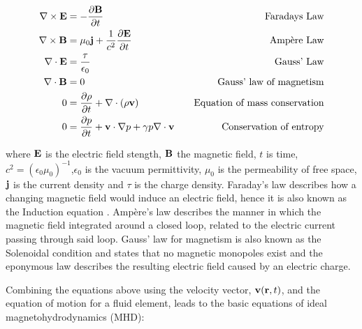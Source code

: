 \begin{align}
	\nabla \times \mathbf{E} &= -\frac{\partial \mathbf{B}}{\partial t }  &\quad \textnormal{Faradays Law}\\
	\nabla \times \mathbf{B} &= \mu_0\mathbf{j} + \frac{1}{c^2}\frac{\partial \mathbf{E}}{\partial t } &\quad \textnormal{Amp{\`e}re Law}\\
	\nabla\cdot\mathbf{E} &= \frac{\tau}{\epsilon_0} &\quad \textnormal{Gauss' Law}\\
	\nabla\cdot\mathbf{B} &= 0 & \quad \textnormal{Gauss' law of magnetism}\\
	0 &= \frac{\partial \rho}{\partial t } + \nabla \cdot (\rho\mathbf{v}) & \quad\textnormal{Equation of mass conservation}\\
	0 &= \frac{\partial p}{\partial t } + \mathbf{v}\cdot\nabla p + \gamma p\nabla\cdot\mathbf{v} & \quad \textnormal{Conservation of entropy}
\end{align}

\noindent where $\mathbf{E}$ is the electric field stength, $\mathbf{B}$ the magnetic field, $t$ is time, $c^2 = (\epsilon_0\mu_0)^{-1}$,$\epsilon_0$ is the vacuum permittivity, $\mu_0$ is the permeability of free space, $\mathbf{j}$ is the current density and $\tau$ is the charge density.
Faraday's law describes how a changing magnetic field would induce an electric field, hence it is also known as the Induction equation \citep{Goedbloed2004}.
Amp{\`e}re's law describes the manner in which the magnetic field integrated around a closed loop, related to the electric current passing through said loop.
Gauss' law for magnetism is also known as the Solenoidal condition and states that no magnetic monopoles exist and the eponymous law describes the resulting electric field caused by an electric charge.


Combining the equations above using the velocity vector, $\mathbf{v}(\mathbf{r},t)$, and the equation of motion for a fluid element, leads to the basic equations of ideal magnetohydrodynamics (MHD):

